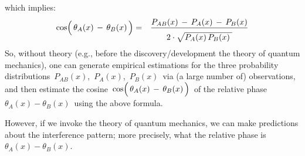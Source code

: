 which implies:
\begin{eqnarray*}
\cos\!\left(\,\theta_{A}(x)\,\overset{{\color{white}.}}{-}\,\theta_{B}(x)\,\right)
& = &
	\dfrac{
        P_{AB}(x) \,-\, P_{A}(x) \,-\, P_{B}(x)
        }{
        \overset{{\color{white}.}}{
            2 \cdot \sqrt{P_{A}(x)\,P_{B}(x){\color{white}.}}
            }
        }
\end{eqnarray*}
So, without theory (e.g., before the discovery/development the theory of quantum mechanics),
one can generate empirical estimations for the three probability distributions
\,$P_{AB}(x)$,\, $P_{A}(x)$,\, $P_{B}(x)$\,
via (a large number of) observations, and then estimate the cosine
\,$\cos\!\left(\,\theta_{A}(x)\,\overset{{\color{white}.}}{-}\,\theta_{B}(x)\,\right)$\,
of the relative phase
\,$\theta_{A}(x)-\theta_{B}(x)$\,
using the above formula. 

\vskip 0.5cm
\noindent
However, if we invoke the theory of quantum mechanics, we can make predictions
about the interference pattern;
more precisely, what the relative phase is $\theta_{A}(x)-\theta_{B}(x)$.